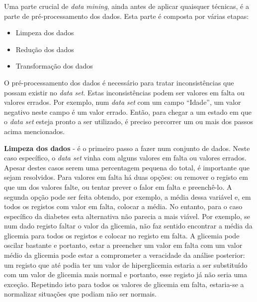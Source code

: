 Uma parte crucial de \textit{data mining}, ainda antes de aplicar quaisquer técnicas, é a parte de pré-processamento dos dados. Esta parte é composta por várias etapas:

\begin{itemize}
\item Limpeza dos dados
\item Redução dos dados
\item Transformação dos dados
\end{itemize}
 
O pré-processamento dos dados é necessário para tratar inconsistências que possam existir no \textit{data set}. Estas inconsistências podem ser valores em falta ou valores errados. Por exemplo, num \textit{data set} com um campo ``Idade'', um valor negativo neste campo é um valor errado. Então, para chegar a um estado em que o \textit{data set} esteja pronto a ser utilizado, é preciso percorrer um ou mais dos passos acima mencionados. 

\textbf{Limpeza dos dados} - é o primeiro passo a fazer num conjunto de dados. Neste caso específico, o \textit{data set} vinha com alguns valores em falta ou valores errados. Apesar destes casos serem uma percentagem pequena do total, é importante que sejam resolvidos. Para valores em falta há duas opções: ou remover o registo em que um dos valores falte, ou tentar prever o falor em falta e preenchê-lo. A segunda opção pode ser feita obtendo, por exemplo, a média dessa variável e, em todos os registos com valor em falta, colocar a média. No entanto, para o caso específico da diabetes esta alternativa não parecia a mais viável. Por exemplo, se num dado registo faltar o valor da glicemia, não faz sentido encontrar a média da glicemia para todos os registos e colocar no registo em falta. A glicemia pode oscilar bastante e portanto, estar a preencher um valor em falta com um valor médio da glicemia pode estar a comprometer a veracidade da análise posterior: um registo que até podia ter um valor de hiperglicemia estaria a ser substituído com um valor de glicemia mais normal e portanto, esse registo já não seria uma exceção. Repetindo isto para todos os valores de glicemia em falta, estaria-se a normalizar situações que podiam não ser normais. 

